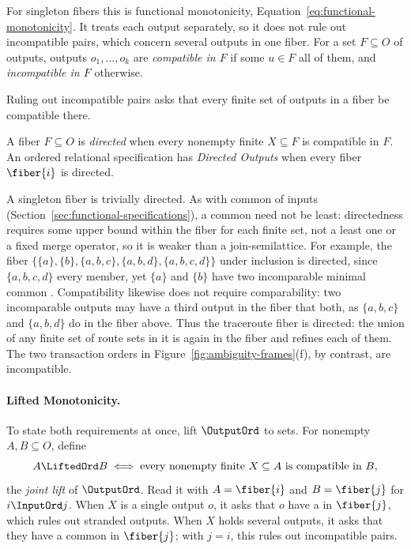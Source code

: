 For singleton fibers this is functional monotonicity,
Equation~\ref{eq:functional-monotonicity}.  It treats each output separately,
so it does not rule out incompatible pairs, which concern several outputs in
one fiber.
For a set $F\subseteq O$ of outputs, outputs $o_1,\ldots,o_k$ are
\emph{compatible in $F$} if some $u\in F$ \outrel all of them, and
\emph{incompatible in $F$} otherwise.

Ruling out incompatible pairs asks that every finite set of outputs in a
fiber be compatible there.

\begin{definition}
\label{def:fiber-directedness}
A fiber $F\subseteq O$ is \emph{directed} when every nonempty finite
$X\subseteq F$ is compatible in $F$.  An ordered relational specification has
\emph{Directed Outputs} when every fiber $\fiber{i}$ is directed.
\end{definition}

A singleton fiber is trivially directed.  As with common \indescs of inputs
(Section~\ref{sec:functional-specifications}), a common \outnoun need not be
least: directedness requires some upper bound within the fiber for each finite
set, not a least one or a fixed merge operator, so it is weaker than a
join-semilattice.  For example, the fiber
$\{\{a\},\{b\},\{a,b,c\},\{a,b,d\},\{a,b,c,d\}\}$ under inclusion is directed,
since $\{a,b,c,d\}$ \outrel every member, yet $\{a\}$ and $\{b\}$ have two
incomparable minimal common \outnouns.  Compatibility likewise does not require
comparability: two incomparable outputs may have a third output in the fiber
that \outrel both, as $\{a,b,c\}$ and $\{a,b,d\}$ do in the fiber above.  Thus
the traceroute fiber is directed: the union of any finite set of route sets in
it is again in the fiber and refines each of them. The two transaction orders in
Figure~\ref{fig:ambiguity-frames}(f), by contrast, are incompatible.

\paragraph{Lifted Monotonicity.}
To state both requirements at once, lift $\OutputOrd$ to sets.  For nonempty
$A,B\subseteq O$, define
        \begin{equation}
  A\LiftedOrd B
  \;\Longleftrightarrow\;
  \text{every nonempty finite }X\subseteq A\text{ is compatible in }B,
  \label{eq:joint-output-order}
        \end{equation}
the \emph{joint lift} of $\OutputOrd$.  Read it with $A=\fiber{i}$ and
$B=\fiber{j}$ for $i\InputOrd j$.  When $X$ is a single output $o$, it asks
that $o$ have a \outnoun in $\fiber{j}$, which rules out stranded outputs.  When $X$
holds several outputs, it asks that they have a common \outnoun in $\fiber{j}$; with
$j=i$, this rules out incompatible pairs.

